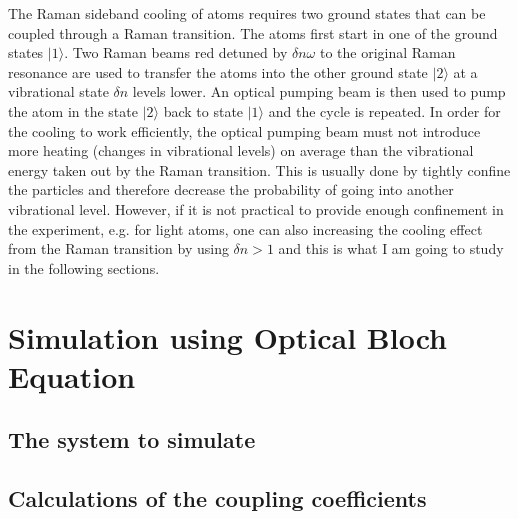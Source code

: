 \documentclass[aps,twocolumn,secnumarabic,balancelastpage,amsmath,amssymb,nofootinbib]{revtex4}
\begin{document}
The Raman sideband cooling of atoms requires two ground states that can be coupled through a Raman transition. The atoms first start in one of the ground states $|1\rangle$. Two Raman beams red detuned by $\delta n\omega$ to the original Raman resonance are used to transfer the atoms into the other ground state $|2\rangle$ at a vibrational state $\delta n$ levels lower. An optical pumping beam is then used to pump the atom in the state $|2\rangle$ back to state $|1\rangle$ and the cycle is repeated. In order for the cooling to work efficiently, the optical pumping beam must not introduce more heating (changes in vibrational levels) on average than the vibrational energy taken out by the Raman transition. This is usually done by tightly confine the particles and therefore decrease the probability of going into another vibrational level. However, if it is not practical to provide enough confinement in the experiment, e.g. for light atoms, one can also increasing the cooling effect from the Raman transition by using $\delta n>1$ and this is what I am going to study in the following sections.

\section{Simulation using Optical Bloch Equation}
\subsection{The system to simulate}
\subsection{Calculations of the coupling coefficients}
\end{document}

